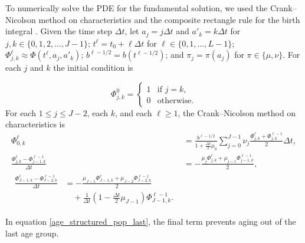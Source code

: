 \documentclass{jpmarticle}
\let\subequationsorig\subequations%
\let\endsubequationsorig\endsubequations%
\renewenvironment{subequations}{
  \subequationsorig
  \renewcommand{\theequation}{\theparentequation.\arabic{equation}}
}{
  \endsubequationsorig
}
\begin{document}
To numerically solve the PDE for the fundamental solution, we used the
Crank--Nicolson method on characteristics and the composite rectangle
rule for the birth integral \autocite{milner_1992}.  Given the time
step $\Delta t$, let $a_j = j \Delta t$ and $a'_k = k \Delta t$ for
$j, k \in \{0, 1, 2, \ldots, J - 1\}$;
$t^{\ell} = t_0 + \ell \Delta t$ for
$\ell \in \{0, 1, \ldots, L - 1\}$;
$\Phi_{j, k}^{\ell} \approx \Phi(t^{\ell}, a_j, a'_k)$;
$b^{\ell - 1 / 2} = b(t^{\ell - 1 / 2})$; and
$\pi_j = \pi(a_j)$ for $\pi \in \{\mu, \nu\}$.
For each $j$ and $k$ the initial condition is
\begin{subequations}
  \begin{equation}
    \Phi_{j, k}^0 =
    \begin{cases}
      1 & \text{if $j = k$}, \\
      0 & \text{otherwise}.
    \end{cases}
  \end{equation}
  For each $1 \leq j \leq J - 2$, each $k$, and each $\ell
  \geq 1$, the Crank--Nicolson method on characteristics is
  \begin{align}
    \Phi_{0, k}^{\ell}
    &= \frac{b^{\ell - 1 / 2}}{1 + \frac{\Delta t}{2} \mu_0}
    \sum_{j = 0}^{J - 1}
    \nu_j \frac{\Phi_{j, k}^{\ell} + \Phi_{j, k}^{\ell - 1}}{2}
    \Delta t,
    \\
    \frac{\Phi_{j, k}^{\ell} - \Phi_{j - 1, k}^{\ell - 1}}{\Delta t}
    &= - \frac{\mu_j \Phi_{j, k}^{\ell}
      + \mu_{j - 1} \Phi_{j - 1, k}^{\ell - 1}}{2},
    \\
    \begin{split}
      \frac{\Phi_{J - 1, k}^{\ell} - \Phi_{J - 2, k}^{\ell - 1}}{\Delta t}
      &= - \frac{\mu_{J - 1} \Phi_{J - 1, k}^{\ell}
        + \mu_{J - 2} \Phi_{J - 2, k}^{\ell - 1}}{2}
      \\
      & \quad {}
      + \frac{1}{\Delta t} \left(1 - \frac{\Delta t}{2} \mu_{J - 1}\right)
      \Phi_{J - 1, k}^{\ell - 1}.
    \end{split}
    \label{age_structured_pop_last}
  \end{align}
\end{subequations}
In equation \eqref{age_structured_pop_last}, the final term prevents
aging out of the last age group.
\end{document}
